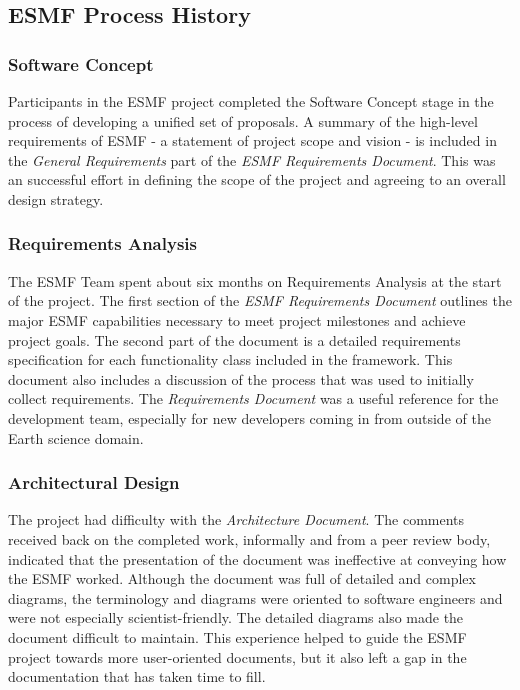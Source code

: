 \subsection{ESMF Process History}

\subsubsection{Software Concept}
Participants in the ESMF project completed the Software Concept
stage in the process of developing a unified set of proposals.
A summary of the high-level requirements of ESMF - a statement of project
scope and vision - is included in the {\it General Requirements}
part of the {\it ESMF Requirements Document}\cite{bib:ESMFreqdoc}.
This was an successful effort in defining the scope of the project
and agreeing to an overall design strategy.

\subsubsection {Requirements Analysis}
The ESMF Team spent about six months on Requirements Analysis at
the start of the project.
The first section of the {\it ESMF Requirements Document} outlines 
the major ESMF capabilities necessary to meet project milestones and achieve 
project goals.  The second part of the document is a detailed 
requirements specification for each functionality class included in 
the framework.  This document also includes a discussion of the 
process that was used to initially collect requirements.
The {\it Requirements Document} was a useful reference for the development
team, especially for new developers coming in from outside of the
Earth science domain.

\subsubsection{Architectural Design}
The project had difficulty with the {\it Architecture Document}.  
The comments received back on the completed work, informally and
from a peer review body, indicated that the presentation of the document
was ineffective at conveying how the ESMF worked. Although the
document was full of detailed and complex diagrams, the terminology and
diagrams were oriented to software engineers and were not especially
scientist-friendly.  The detailed diagrams also made the document difficult
to maintain.  This experience helped to guide the ESMF project 
towards more user-oriented documents, but it also left a gap in the 
documentation that has taken time to fill.

